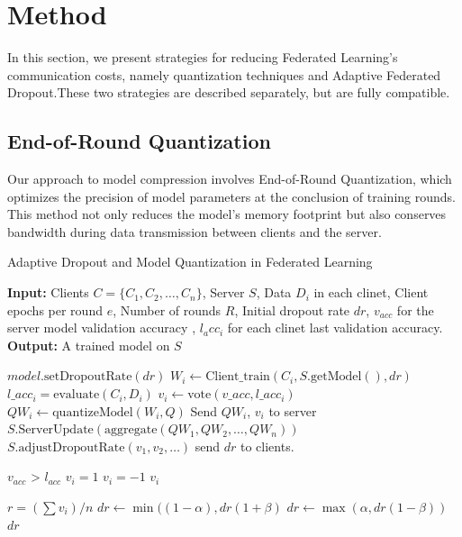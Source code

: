 \documentclass{article}
\begin{document}
\section{Method}

In this section, we present strategies for reducing Federated Learning’s communication costs, namely quantization techniques and Adaptive Federated Dropout.These two strategies are described separately, but are fully compatible.

\subsection{End-of-Round Quantization}
Our approach to model compression involves End-of-Round Quantization, which optimizes the precision of model parameters at the conclusion of training rounds. This method not only reduces the model's memory footprint but also conserves bandwidth during data transmission between clients and the server. 


\begin{algorithm}
\caption{Adaptive Dropout and Model Quantization in Federated Learning}
\begin{algorithmic}[1]
\State \textbf{Input:} Clients $C = \{C_1, C_2, \ldots, C_n\}$, Server $S$, Data $D_{i}$ in each clinet, Client epochs per round $e$, Number of rounds $R$, Initial dropout rate $dr$, $v_{acc}$ for the server model validation accuracy , $l_acc_{i}$ for each clinet last validation accuracy.
\State \textbf{Output:} A trained model on $S$

    \State $model.\text{setDropoutRate}(dr)$
            \State $W_i \gets \text{Client\_train}(C_{i}, S.\text{getModel}(), dr)$
            \State $l\_acc_{i} = \text{evaluate}(C_i,D_{i})$
            \State $v_{i} \gets \text{vote}( v\_acc, l\_acc_{i})$
            \State $QW_i \gets \text{quantizeModel}(W_i, Q)$
            \State Send $QW_i$, $v_{i}$ to server
        \EndFor
        \State $S.\text{ServerUpdate}(\text{aggregate}(QW_1, QW_2, \ldots, QW_n))$
        \State $S.\text{adjustDropoutRate}(v_{1}, v_{2}, \ldots)$
        \State send $dr$ to clients.
    \EndFor
\EndProcedure


    \If$v_{acc}$ > $l_{acc}$
        \State $v_{i} = 1$
    \Else
        \State $v_{i} = -1$
    \EndIf
    \State \Return $v_{i}$
\EndProcedure

    \State $ r = (\sum v_{i}) / n  $
        \State $dr \gets \min(( 1 - \alpha), dr(1+\beta )$
    \Else
        \State $dr \gets \max(\alpha, dr(1-\beta) )$
    \EndIf
    \State \Return $dr$
\EndFunction
\label{algo:fed}
\end{algorithmic}
\end{algorithm}
\end{document}
